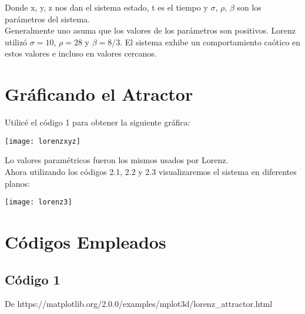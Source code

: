 \documentclass[12pt,a4paper]{article}
\begin{document}
Donde x, y, z nos dan el sistema estado, t es el tiempo y $\sigma$, $\rho$, $\beta$ son los parámetros del sistema. \\

Generalmente uno asuma que los valores de los parámetros son positivos. Lorenz utilizó $\sigma=10$, $\rho=28$ y $\beta=8/3$. El sistema exhibe un comportamiento caótico en estos valores e incluso en valores cercanos.

\newpage

\section{Gráficando el Atractor}

Utilicé el código 1 para obtener la siguiente gráfica:
\begin{center}
\texttt{[image: lorenzxyz]}
\end{center}

Lo valores paramétricos fueron los mismos usados por Lorenz. \\

Ahora utilizando los códigos 2.1, 2.2 y 2.3 visualizaremos el sistema en diferentes planos:

\begin{center}
\texttt{[image: lorenz3]}
\end{center}

\section{Códigos Empleados}

\subsection{Código 1}

De https://matplotlib.org/2.0.0/examples/mplot3d/lorenz\_attractor.html
\end{document}
